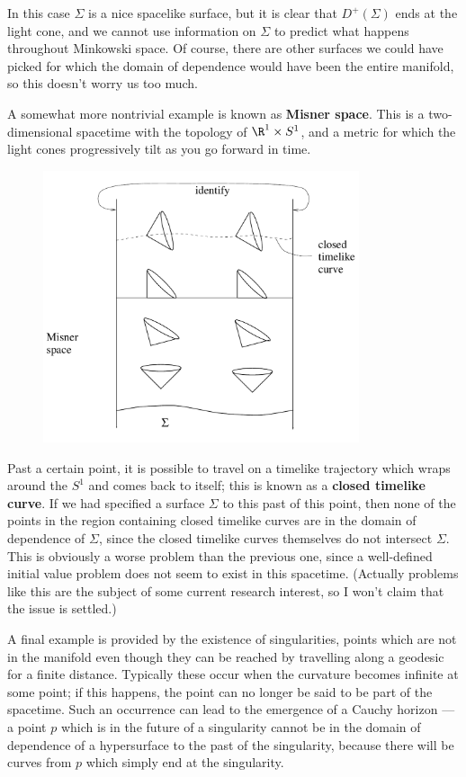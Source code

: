 \documentclass[12pt]{article}
\begin{document}
\noindent In this case $\Sigma$ is a nice spacelike surface, but
it is clear that $D^+(\Sigma)$ ends at the light cone, and we cannot
use information on $\Sigma$ to predict what happens throughout 
Minkowski space.  Of course, there are other surfaces we could have
picked for which the domain of dependence would have been the entire
manifold, so this doesn't worry us too much.

A somewhat more nontrivial example is known as {\bf Misner space}.
This is a two-dimensional spacetime with the topology of $\R^1\times
S^1$, and a metric for which the light cones progressively tilt as
you go forward in time.
\begin{figure}
  \centerline{
  \includegraphics[height=8cm]{pdf/four13}}
\end{figure}
Past a certain point, it is possible to travel on a timelike
trajectory which wraps around the $S^1$ and comes back to itself; this
is known as a {\bf closed timelike curve}.  If we had specified a
surface $\Sigma$ to this past of this point, then none of the points
in the region containing closed timelike curves are in the domain of
dependence of $\Sigma$, since the closed timelike curves themselves
do not intersect $\Sigma$.  This is obviously a worse problem than
the previous one, since a well-defined initial value problem does not
seem to exist in this spacetime.  (Actually problems like this are
the subject of some current research interest, so I won't claim that
the issue is settled.)

A final example is provided by the existence of singularities, points
which are not in the manifold even though they can be reached by
travelling along a geodesic for a finite distance.  Typically these
occur when the curvature becomes infinite at some point; if this
happens, the point can no longer be said to be part of the spacetime.
Such an occurrence can lead to the emergence of a Cauchy horizon ---
a point $p$ which is in the future of a singularity cannot be in the
domain of dependence of a hypersurface to the past of the singularity,
because there will be curves from $p$ which simply end at the 
singularity.
\end{document}

